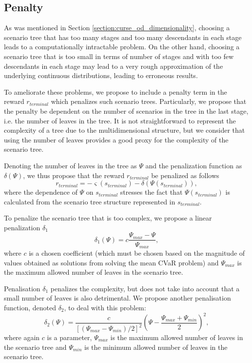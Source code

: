 \subsection{Penalty}
As was mentioned in Section \ref{section:curse_od_dimensionality}, choosing a scenario tree that has too many stages and too many descendants in each stage leads to a computationally intractable problem. On the other hand, choosing a scenario tree that is too small in terms of number of stages and with too few descendants in each stage may lead to a very rough approximation of the underlying continuous distributions, leading to erroneous results. 

To ameliorate these problems, we propose to include a penalty term in the reward $r_{terminal}$ which penalizes such scenario trees. Particularly, we propose that the penalty be dependent on the number of scenarios in the tree in the last stage, i.e. the number of leaves in the tree. It is not straightforward to represent the complexity of a tree due to the multidimensional structure, but we consider that using the number of leaves provides a good proxy for the complexity of the scenario tree. 

Denoting the number of leaves in the tree as $\Psi$ and the penalization function as $\delta(\Psi)$, we thus propose that the reward $r_{terminal}$ be penalized as follows
\begin{equation*}
r_{terminal} = -\varsigma(s_{terminal}) - \delta(\Psi(s_{terminal})),
\end{equation*}
where the dependence of $\Psi$ on $s_{terminal}$ stresses the fact that $\Psi(s_{terminal})$ is calculated from the scenario tree structure represented in $s_{terminal}$.

To penalize the scenario tree that is too complex, we propose a linear penalization $\delta_1$
\begin{equation*}
\delta_1(\Psi) = c \frac{\Psi_{max}-\Psi}{\Psi_{max}},
\end{equation*}
where $c$ is a chosen coefficient (which must be chosen based on the magnitude of values obtained as solutions from solving the mean CVaR problem) and $\Psi_{max}$ is the maximum allowed number of leaves in the scenario tree.

Penalisation $\delta_1$ penalizes the complexity, but does not take into account that a small number of leaves is also detrimental. We propose another penalisation function, denoted $\delta_2$, to deal with this problem:
\begin{equation*}
\delta_2(\Psi) = \frac{c}{\left[(\Psi_{max}-\Psi_{min})/2\right]^2} (\Psi - \frac{\Psi_{max}+\Psi_{min}}{2})^2,
\end{equation*}
where again $c$ is a parameter, $\Psi_{max}$ is the maximum allowed number of leaves in the scenario tree and $\Psi_{min}$ is the minimum allowed number of leaves in the scenario tree.

